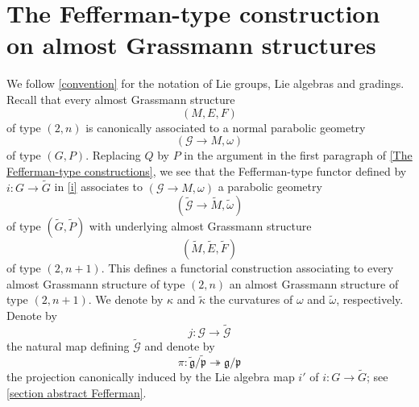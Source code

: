 \documentclass[11pt]{amsart}
\begin{document}
\section{The Fefferman-type construction on almost Grassmann structures}\label{A generalization}
We follow \cref{convention} for the notation of Lie groups, Lie algebras and gradings. Recall that every almost Grassmann structure
\[(M,E,F)\]
of type $(2,n)$ is canonically associated to a normal parabolic geometry
\[(\mathcal G\to M,\omega)\]
of type $(G,P)$. Replacing $Q$ by $P$ in the argument in the first paragraph of \cref{The Fefferman-type constructions}, we see that the Fefferman-type functor defined by $i:G\to\tilde G$ in \eqref{i} associates to $(\mathcal G\to M,\omega)$ a parabolic geometry \[(\tilde{\mathcal G}\to\tilde M,\tilde\omega)\] of type $(\tilde G,\tilde P)$ with underlying almost Grassmann structure \[(\tilde M,\tilde E,\tilde F)\] of type $(2,n+1)$. This defines a functorial construction
associating to every almost Grassmann structure of type $(2,n)$ an almost Grassmann structure of type $(2,n+1)$. We denote by $\kappa$ and $\tilde\kappa$ the curvatures of $\omega$ and $\tilde\omega$, respectively. Denote by 
\[j:\mathcal G\to\tilde{\mathcal G}\]
the natural map defining $\tilde{\mathcal G}$ and denote by
\[\pi:\tilde{\mathfrak g}/\tilde{\mathfrak p}\twoheadrightarrow\mathfrak g/\mathfrak p\]
the projection canonically induced by the Lie algebra map $i'$ of $i:G\to\tilde G$; see \cref{section abstract Fefferman}.
\end{document}
